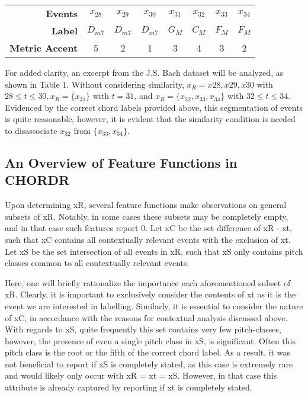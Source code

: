\documentclass{article} %
\begin{document}
\begin{tabular}{ r | c c c c c c c }
  \textbf{Events}        & $x_{28}$ & $x_{29}$ & $x_{30}$ & $x_{31}$ & $x_{32}$ & $x_{33}$ & $x_{34}$ \\
  \textbf{Label}         & $D_{m7}$ & $D_{m7}$ & $D_{m7}$ & $G_M$ & $C_M$ & $F_M$ & $F_M$ \\
  \textbf{Metric Accent} & 5 & 2 & 1 & 3 & 4 & 3 & 2 \\
\end{tabular}

For added clarity, an excerpt from the J.S. Bach dataset will be analyzed, as shown in Table 1. Without considering similarity, $x_R = { x28, x29, x30 }$ with $28 \leq t \leq 30, x_R = \{ x_31 \}$ with $t = 31$, and $x_R = \{ x_{32}, x_{33}, x_{34} \}$ with $32 \leq t \leq 34$. Evidenced by the correct chord labels provided above, this segmentation of events is quite reasonable, however, it is evident that the similarity condition is needed to disassociate $x_{32}$ from $\{ x_{33}, x_{34} \}$.

\subsection{An Overview of Feature Functions in CHORDR}

Upon determining xR, several feature functions make observations on general subsets of xR. Notably, in some cases these subsets may be completely empty, and in that case such features report 0. Let xC be the set difference of xR - xt, such that xC contains all contextually relevant events with the exclusion of xt. Let xS be the set intersection of all events in xR, such that xS only contains pitch classes common to all contextually relevant events.

Here, one will briefly rationalize the importance each aforementioned subset of xR. Clearly, it is important to exclusively consider the contents of xt as it is the event we are interested in labelling. Similarly, it is essential to consider the nature of xC, in accordance with the reasons for contextual analysis discussed above. With regards to xS, quite frequently this set contains very few pitch-classes, however, the presence of even a single pitch class in xS, is significant. Often this pitch class is the root or the fifth of the correct chord label. As a result, it was not beneficial to report if xS is completely stated, as this case is extremely rare and would likely only occur with xR = xt = xS. However, in that case this attribute is already captured by reporting if xt is completely stated.
\end{document}
